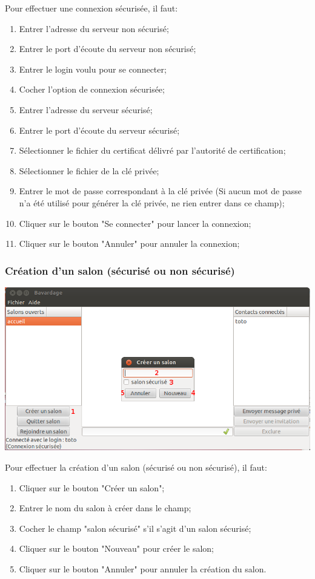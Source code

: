 \documentclass[a4paper,11pt,french]{book}
\begin{document}
Pour effectuer une connexion sécurisée, il faut:

\begin{enumerate}
    \item Entrer l'adresse du serveur non sécurisé;
    \item Entrer le port d'écoute du serveur non sécurisé;
    \item Entrer le login voulu pour se connecter;
    \item Cocher l'option de connexion sécurisée;
    \item Entrer l'adresse du serveur sécurisé;
    \item Entrer le port d'écoute du serveur sécurisé;
    \item Sélectionner le fichier du certificat délivré par l'autorité de certification;
    \item Sélectionner le fichier de la clé privée;
    \item Entrer le mot de passe correspondant à la clé privée (Si aucun mot de passe n'a été utilisé pour générer la clé privée, ne rien entrer dans ce champ);
    \item Cliquer sur le bouton "Se connecter" pour lancer la connexion;
    \item Cliquer sur le bouton "Annuler" pour annuler la connexion;
\end{enumerate}
\newpage

\subsubsection{Création d'un salon (sécurisé ou non sécurisé)}

\includegraphics[width=40em]{capture/cre_room.png}

Pour effectuer la création d'un salon (sécurisé ou non sécurisé), il faut:
\begin{enumerate}
    \item Cliquer sur le bouton "Créer un salon";
    \item Entrer le nom du salon à créer dans le champ;
    \item Cocher le champ "salon sécurisé" s'il s'agit d'un salon sécurisé;
    \item Cliquer sur le bouton "Nouveau" pour créer le salon;
    \item Cliquer sur le bouton "Annuler" pour annuler la création du salon.
\end{enumerate}
\newpage
\end{document}
